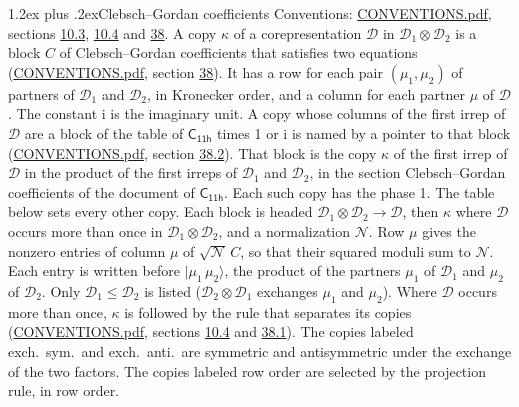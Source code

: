 \documentclass[10pt,a4paper]{article}
\makeatletter
\renewcommand\section{\@startsection{section}{1}{\z@}{-3ex plus -1ex minus -.2ex}%
  {1.2ex plus .2ex}{\normalfont\large\sffamily\bfseries\color{parttitle}}}
\numberwithin{equation}{section}
\newcommand{\grp}[1]{\mathsf{#1}}
\newcommand{\iunit}{\mathrm{i}}
\newcommand{\irrprod}{\otimes}
\newcommand{\mult}{\kappa}
\newcommand{\intx}{\mu}
\newcommand{\cgnorm}{\mathcal{N}}
\newcommand{\prodket}[2]{\lvert {#1}\,{#2}\rangle}
\makeatother
\begin{document}
\section{Clebsch--Gordan coefficients}\label{s:clebsch_gordan}
Conventions: \href{../../CONVENTIONS.pdf}{CONVENTIONS.pdf}, sections \href{../../../rotation/CONVENTIONS.pdf\#conv.10.3}{10.3}, \href{../../../rotation/CONVENTIONS.pdf\#conv.10.4}{10.4} and \href{../../CONVENTIONS.pdf\#conv.38}{38}.
\leavevmode\label{n:index.copy}\label{n:matrix.cg.stored}A copy $\mult$ of a corepresentation $\mathcal{D}$ in $\mathcal{D}_1\irrprod\mathcal{D}_2$ is a block $C$ of Clebsch--Gordan coefficients that satisfies two equations (\href{../../CONVENTIONS.pdf}{CONVENTIONS.pdf}, section \href{../../CONVENTIONS.pdf\#conv.38}{38}). \label{n:index.cg}It has a row for each pair $(\intx_1, \intx_2)$ of partners of $\mathcal{D}_1$ and $\mathcal{D}_2$, in Kronecker order, and a column for each partner $\intx$ of $\mathcal{D}$.
The constant $\iunit$ is the imaginary unit.
A copy whose columns of the first irrep of $\mathcal{D}$ are a block of the table of $\grp{C_{11h}}$ times 1 or $\iunit$ is named by a pointer to that block (\href{../../CONVENTIONS.pdf}{CONVENTIONS.pdf}, section \href{../../CONVENTIONS.pdf\#conv.38.2}{38.2}). That block is the copy $\mult$ of the first irrep of $\mathcal{D}$ in the product of the first irreps of $\mathcal{D}_1$ and $\mathcal{D}_2$, in the section Clebsch--Gordan coefficients of the document of \href{../../../rotation/data/pdf/C11h.pdf}{$\grp{C_{11h}}$}. Each such copy has the phase 1. The table below sets every other copy.
Each block is headed $\mathcal{D}_1\irrprod\mathcal{D}_2\to\mathcal{D}$, then $\mult$ where $\mathcal{D}$ occurs more than once in $\mathcal{D}_1\irrprod\mathcal{D}_2$, and a normalization $\cgnorm$. Row $\intx$ gives the nonzero entries of column $\intx$ of $\sqrt{\cgnorm}\,C$, so that their squared moduli sum to $\cgnorm$. \label{n:vector.ket.product}Each entry is written before $\prodket{\intx_1}{\intx_2}$, the product of the partners $\intx_1$ of $\mathcal{D}_1$ and $\intx_2$ of $\mathcal{D}_2$. Only $\mathcal{D}_1 \le \mathcal{D}_2$ is listed ($\mathcal{D}_2\irrprod\mathcal{D}_1$ exchanges $\intx_1$ and $\intx_2$).
Where $\mathcal{D}$ occurs more than once, $\mult$ is followed by the rule that separates its copies (\href{../../CONVENTIONS.pdf}{CONVENTIONS.pdf}, sections \href{../../../rotation/CONVENTIONS.pdf\#conv.10.4}{10.4} and \href{../../CONVENTIONS.pdf\#conv.38.1}{38.1}). \label{n:abbreviation.exchange}The copies labeled exch.\ sym.\ and exch.\ anti.\ are symmetric and antisymmetric under the exchange of the two factors. The copies labeled row order are selected by the projection rule, in row order.
\end{document}
